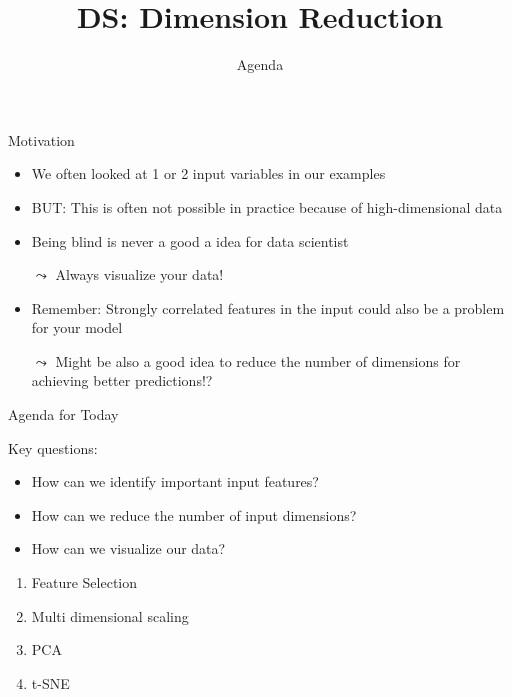 \documentclass[aspectratio=169]{../latex_main/tntbeamer}  %
\title[Statistics]{DS: Dimension Reduction}
\subtitle{Agenda}
\begin{document}
	
	\maketitle
	
    \begin{frame}{Motivation}

    \begin{itemize}
        \item We often looked at 1 or 2 input variables in our examples
        \item BUT: This is often not possible in practice because of high-dimensional data
        \medskip
        \pause
        \item Being blind is never a good a idea for data scientist
        \item[$\leadsto$] Always visualize your data!
        \medskip
        \pause
        \item Remember: Strongly correlated features in the input could also be a problem for your model
        \item[$\leadsto$] Might be also a good idea to reduce the number of dimensions for achieving better predictions!?
    \end{itemize}

	\end{frame}
	
	\begin{frame}{Agenda for Today}

 Key questions: 
    \begin{itemize} 
        \item How can we identify important input features?
        \item How can we reduce the number of input dimensions?
        \item How can we visualize our data?
    \end{itemize}
            
    \pause
    \medskip
    
    \begin{enumerate}
        \item Feature Selection
        \item Multi dimensional scaling
        \item PCA
        \item t-SNE
    \end{enumerate}


	\end{frame}
	
\end{document}
